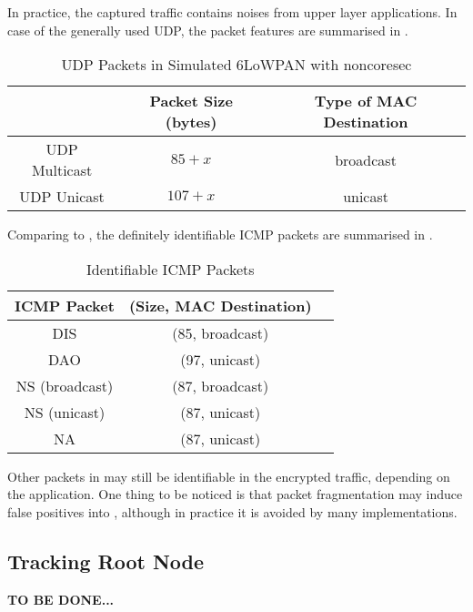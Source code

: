 In practice, the captured traffic contains noises from upper layer applications. In case of the generally used UDP\cite{rfc768}, the packet features are summarised in .

\begin{table}[ht!]
	\center
	{
		\begin{tabular}{|c|c|c|}
			\hline
			       & Packet Size (bytes) & Type of MAC Destination \\ \hline
			UDP Multicast   & $85+x$                  & broadcast                       \\ \hline
			UDP Unicast   & $107+x$                  & unicast                       \\ \hline
		\end{tabular}
	}
	\caption{UDP Packets in Simulated 6LoWPAN with noncoresec}
	\label{UDPPacketFeature}
\end{table}

Comparing  to , the definitely identifiable ICMP packets are summarised in .

\begin{table}[ht!]
	\center
	{
		\begin{tabular}{|c|c|c|}
			\hline
			ICMP Packet & (Size, MAC Destination)\\ \hline
			DIS   & (85, broadcast)                       \\ \hline
			DAO   & (97, unicast)                       \\ \hline
			NS (broadcast)   & (87, broadcast)                       \\ \hline	
			NS (unicast)   & (87, unicast)                       \\ \hline
			NA 	& (87, unicast)                       \\ \hline
		\end{tabular}
	}
	\caption{Identifiable ICMP Packets}
	\label{TAICMP}
\end{table}

Other packets in  may still be identifiable in the encrypted traffic, depending on the application. One thing to be noticed is that packet fragmentation may induce false positives into , although in practice it is avoided by many implementations.

\subsection{Tracking Root Node}
\textbf{TO BE DONE...}
